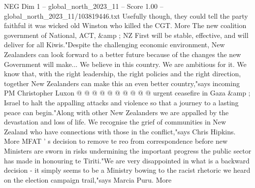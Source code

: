 \begin{textsample}{NEG Dim 1 – global\_north\_2023\_11 – Score 1.00 – global\_north\_2023\_11/103819446.txt}
Usefully though, they could tell the party faithful it was wicked old Winston who killed the CGT.
More The new coalition government of National, ACT, \&amp ; NZ First will be stable, effective, and will deliver for all Kiwis."Despite the challenging economic environment, New Zealanders can look forward to a better future because of the changes the new Government will make...
We believe in this country.
We are ambitious for it.
We know that, with the right leadership, the right policies and the right direction, together New Zealanders can make this an even better country,"says incoming PM Christopher Luxon @ @ @ @ @ @ @ @ @ @ urgent ceasefire in Gaza \&amp ; Israel to halt the appalling attacks and violence so that a journey to a lasting peace can begin."Along with other New Zealanders we are appalled by the devastation and loss of life.
We recognise the grief of communities in New Zealand who have connections with those in the conflict,"says Chris Hipkins.
More MFAT ' s decision to remove te reo from correspondence before new Ministers are sworn in risks undermining the important progress the public sector has made in honouring te Tiriti."We are very disappointed in what is a backward decision - it simply seems to be a Ministry bowing to the racist rhetoric we heard on the election campaign trail,"says Marcia Puru.
More

\end{textsample}
